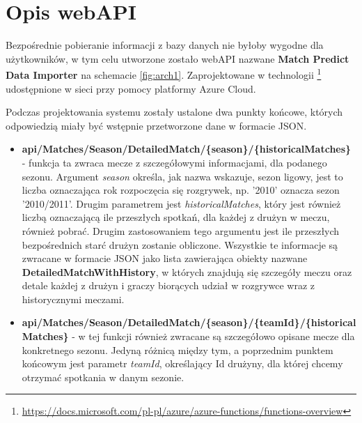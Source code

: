 \section{Opis webAPI} \label{arch:webApi}
\noindent
Bezpośrednie pobieranie informacji z bazy danych nie byłoby wygodne dla użytkowników, w tym celu utworzone zostało webAPI nazwane \textbf{Match Predict Data Importer} na schemacie \ref{fig:arch1}. Zaprojektowane w technologii \footnote{\url{https://docs.microsoft.com/pl-pl/azure/azure-functions/functions-overview}} udostępnione w sieci przy pomocy platformy Azure Cloud.

Podczas projektowania systemu zostały ustalone dwa punkty końcowe, których odpowiedzią miały być wstępnie przetworzone dane w formacie JSON.
\begin{itemize}
    \item \textbf{api/Matches/Season/DetailedMatch/\{season\}/\{historicalMatches\}} - funkcja ta zwraca mecze z szczegółowymi informacjami, dla podanego sezonu. Argument \textit{season} określa, jak nazwa wskazuje, sezon ligowy, jest to liczba oznaczająca rok rozpoczęcia się rozgrywek, np. '2010' oznacza sezon '2010/2011'. Drugim parametrem jest \textit{historicalMatches}, który jest również liczbą oznaczającą ile przeszłych spotkań, dla każdej z drużyn w meczu, również pobrać. Drugim zastosowaniem tego argumentu jest ile przeszłych bezpośrednich starć drużyn zostanie obliczone. Wszystkie te informacje są zwracane w formacie JSON jako lista zawierająca obiekty nazwane \textbf{DetailedMatchWithHistory}, w których znajdują się szczegóły meczu oraz detale każdej z drużyn i graczy biorących udział w rozgrywce wraz z historycznymi meczami. 
    \item \textbf{api/Matches/Season/DetailedMatch/\{season\}/\{teamId\}/\{historicalMatches\}} - w tej funkcji również zwracane są szczegółowo opisane mecze dla konkretnego sezonu. Jedyną różnicą między tym, a poprzednim punktem końcowym jest parametr \textit{teamId}, określający Id drużyny, dla której chcemy otrzymać spotkania w danym sezonie.
\end{itemize}

